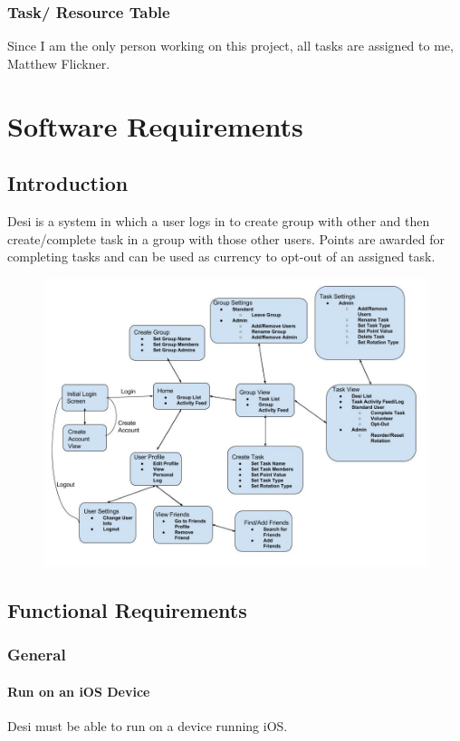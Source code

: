 \documentclass[11pt, a4paper]{report}
\begin{document}
\subsection{Task/ Resource Table}
Since I am the only person working on this project, all tasks are assigned to me, Matthew Flickner.

\chapter{Software Requirements}

\section{Introduction}
Desi is a system in which a user logs in to create group with other and then create/complete task in a group with those other users. Points are awarded for completing tasks and can be used as currency to opt-out of an assigned task.

\begin{figure}[H]
\centering
\includegraphics[width=1.0\textwidth]{umlHighLevel.jpg}
\end{figure}

\section{Functional Requirements}
\subsection{General}
\subsubsection{Run on an iOS Device}
Desi must be able to run on a device running iOS.
\end{document}
